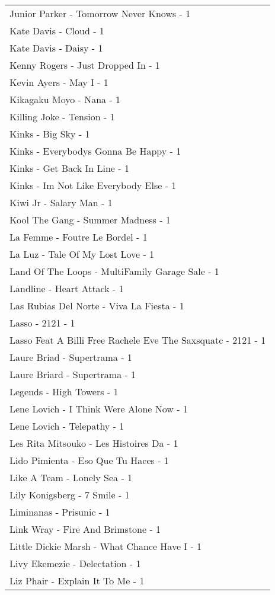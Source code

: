 \documentclass[
]{article}
\begin{document}
\begin{longtable}{l}
Junior Parker - Tomorrow Never Knows - 1 \\ 
Kate Davis - Cloud - 1 \\ 
Kate Davis - Daisy - 1 \\ 
Kenny Rogers - Just Dropped In - 1 \\ 
Kevin Ayers - May I - 1 \\ 
Kikagaku Moyo - Nana - 1 \\ 
Killing Joke - Tension - 1 \\ 
Kinks - Big Sky - 1 \\ 
Kinks - Everybodys Gonna Be Happy - 1 \\ 
Kinks - Get Back In Line - 1 \\ 
Kinks - Im Not Like Everybody Else - 1 \\ 
Kiwi Jr - Salary Man - 1 \\ 
Kool The Gang - Summer Madness - 1 \\ 
La Femme - Foutre Le Bordel - 1 \\ 
La Luz - Tale Of My Lost Love - 1 \\ 
Land Of The Loops - MultiFamily Garage Sale - 1 \\ 
Landline - Heart Attack - 1 \\ 
Las Rubias Del Norte - Viva La Fiesta - 1 \\ 
Lasso - 2121 - 1 \\ 
Lasso Feat A Billi Free Rachele Eve The Saxsquatc - 2121 - 1 \\ 
Laure Briad - Supertrama - 1 \\ 
Laure Briard - Supertrama - 1 \\ 
Legends - High Towers - 1 \\ 
Lene Lovich - I Think Were Alone Now - 1 \\ 
Lene Lovich - Telepathy - 1 \\ 
Les Rita Mitsouko - Les Histoires Da - 1 \\ 
Lido Pimienta - Eso Que Tu Haces - 1 \\ 
Like A Team - Lonely Sea - 1 \\ 
Lily Konigsberg - 7 Smile - 1 \\ 
Liminanas - Prisunic - 1 \\ 
Link Wray - Fire And Brimstone - 1 \\ 
Little Dickie Marsh - What Chance Have I - 1 \\ 
Livy Ekemezie - Delectation - 1 \\ 
Liz Phair - Explain It To Me - 1 \\ 

\end{longtable}
\end{document}
